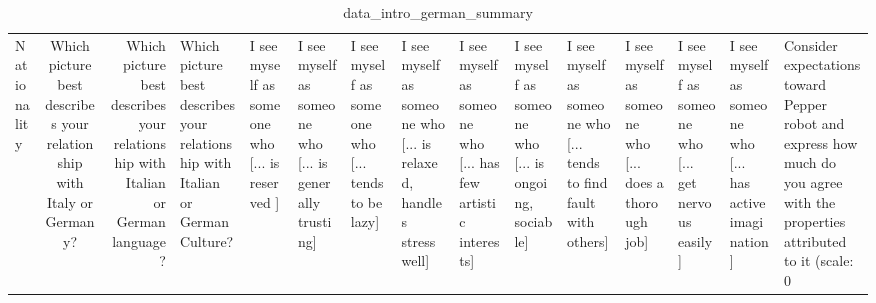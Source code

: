 \begin{table}
\caption{data_intro_german_summary}
\label{tab:data_intro_german_summary}
\begin{tabular}{lcr}
\toprule
Nationality & Which picture best describes your relationship with Italy or Germany? & Which picture best describes your relationship with Italian or German language? & Which picture best describes your relationship with Italian or German Culture? & I see myself as someone who  [... is reserved ] & I see myself as someone who  [... is generally trusting] & I see myself as someone who  [... tends to be lazy] & I see myself as someone who  [... is relaxed, handles stress well] & I see myself as someone who  [... has few artistic interests] & I see myself as someone who  [... is ongoing, sociable] & I see myself as someone who  [... tends to find fault with others] & I see myself as someone who  [... does a thorough job] & I see myself as someone who  [... get nervous easily] & I see myself as someone who  [... has active imagination] & Consider expectations toward Pepper robot and express how much do you agree with the properties attributed to it (scale: 0%
\end{tabular}
\end{table}
